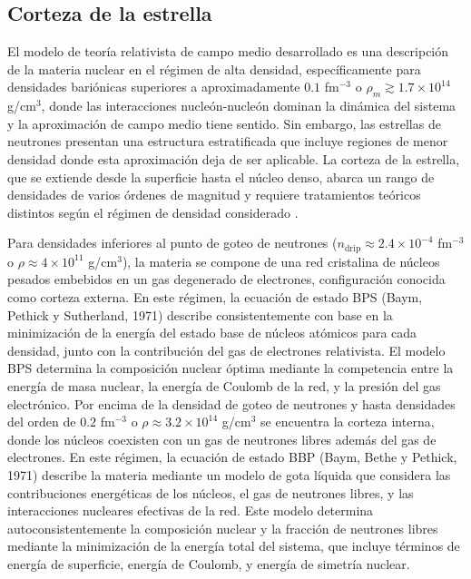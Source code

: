 \subsection{Corteza de la estrella}

El modelo de teoría relativista de campo medio desarrollado es una descripción de la materia nuclear en el régimen de alta densidad, específicamente para densidades bariónicas superiores a aproximadamente $0.1$ fm$^{-3}$ o $\rho_m \gtrsim 1.7 \times 10^{14}$ g/cm$^3$, donde las interacciones nucleón-nucleón dominan la dinámica del sistema y la aproximación de campo medio tiene sentido. Sin embargo, las estrellas de neutrones presentan una estructura estratificada que incluye regiones de menor densidad donde esta aproximación deja de ser aplicable. La corteza de la estrella, que se extiende desde la superficie hasta el núcleo denso, abarca un rango de densidades de varios órdenes de magnitud y requiere tratamientos teóricos distintos según el régimen de densidad considerado \cite{shapiroBlackHolesWhite2008}.

Para densidades inferiores al punto de goteo de neutrones ($n_{\text{drip}} \approx 2.4\times10^{-4}$ fm$^{-3}$ o $\rho \approx 4 \times 10^{11}$ g/cm$^3$), la materia se compone de una red cristalina de núcleos pesados embebidos en un gas degenerado de electrones, configuración conocida como corteza externa. En este régimen, la ecuación de estado BPS (Baym, Pethick y Sutherland, 1971) \cite{baymGroundStateMatter1971} describe consistentemente con base en la minimización de la energía del estado base de núcleos atómicos para cada densidad, junto con la contribución del gas de electrones relativista. El modelo BPS determina la composición nuclear óptima mediante la competencia entre la energía de masa nuclear, la energía de Coulomb de la red, y la presión del gas electrónico. Por encima de la densidad de goteo de neutrones y hasta densidades del orden de $0.2$ fm$^{-3}$ o $\rho \approx 3.2 \times 10^{14}$ g/cm$^3$ se encuentra la corteza interna, donde los núcleos coexisten con un gas de neutrones libres además del gas de electrones. En este régimen, la ecuación de estado BBP (Baym, Bethe y Pethick, 1971) \cite{baymNeutronStarMatter1971} describe la materia mediante un modelo de gota líquida que considera las contribuciones energéticas de los núcleos, el gas de neutrones libres, y las interacciones nucleares efectivas de la red. Este modelo determina autoconsistentemente la composición nuclear y la fracción de neutrones libres mediante la minimización de la energía total del sistema, que incluye términos de energía de superficie, energía de Coulomb, y energía de simetría nuclear.

